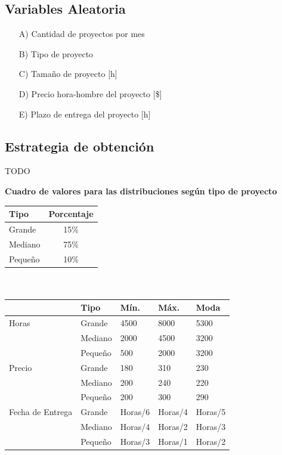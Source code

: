 \documentclass[a4paper,10pt]{article}
\begin{document}
\subsection{Variables Aleatoria}

\begin{itemize}
    \item[A)] Cantidad de proyectos por mes
    \item[B)] Tipo de proyecto
    \item[C)] Tamaño de proyecto [h]
    \item[D)] Precio hora-hombre del proyecto [\$]
    \item[E)] Plazo de entrega del proyecto [h]
\end{itemize}

\subsection{Estrategia de obtención}
TODO


\textbf{Cuadro de valores para las distribuciones según tipo de proyecto}
\\

\begin{tabular}{|l|c|}
\hline
    Tipo        & Porcentaje\\
\hline
    Grande      & 15\%\\
\hline
    Mediano     & 75\%\\
\hline
    Pequeño     & 10\%\\
\hline
\end{tabular}
\\ 
\paragraph*{}


\begin{tabular}{|l|l|l|l|l|}
\hline
                    & Tipo      & Mín.    & Máx.    & Moda\\
\hline
    Horas           & Grande    & 4500    & 8000    & 5300\\
\hline
                    & Mediano   & 2000    & 4500    & 3200\\
\hline
                    & Pequeño   & 500     & 2000    & 3200\\
\hline
    Precio          & Grande    & 180     & 310     & 230\\
\hline
                    & Mediano   & 200     & 240     & 220\\
\hline
                    & Pequeño   & 200     & 300     & 290\\
\hline
    Fecha de Entrega& Grande    & Horas/6 & Horas/4 & Horas/5\\
\hline
                    & Mediano   & Horas/4 & Horas/2 & Horas/3\\
\hline
                    & Pequeño   & Horas/3 & Horas/1 & Horas/2\\
\hline\end{tabular}
\end{document}

